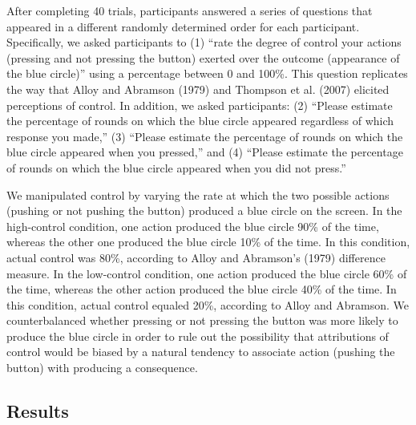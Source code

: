 \documentclass[USenglish,letterpaper,12pt,extrafontsizes,oneside,onecolumn,final]{memoir}
\begin{document}
After completing 40 trials, participants answered a series of questions that appeared in a different randomly determined order for each participant. Specifically, we asked participants to (1) ``rate the degree of control your actions (pressing and not pressing the button) exerted over the outcome (appearance of the blue circle)'' using a percentage between 0 and 100\%. This question replicates the way that Alloy and Abramson (1979) and Thompson et al. (2007) elicited perceptions of control. In addition, we asked participants: (2) ``Please estimate the percentage of rounds on which the blue circle appeared regardless of which response you made,'' (3) ``Please estimate the percentage of rounds on which the blue circle appeared when you pressed,'' and (4) ``Please estimate the percentage of rounds on which the blue circle appeared when you did not press.''

We manipulated control by varying the rate at which the two possible actions (pushing or not pushing the button) produced a blue circle on the screen. In the high-control condition, one action produced the blue circle 90\% of the time, whereas the other one produced the blue circle 10\% of the time. In this condition, actual control was 80\%, according to Alloy and Abramson's (1979) difference measure. In the low-control condition, one action produced the blue circle 60\% of the time, whereas the other action produced the blue circle 40\% of the time. In this condition, actual control equaled 20\%, according to Alloy and Abramson. We counterbalanced whether pressing or not pressing the button was more likely to produce the blue circle in order to rule out the possibility that attributions of control would be biased by a natural tendency to associate action (pushing the button) with producing a consequence. 

\subsection{Results}
\end{document}
